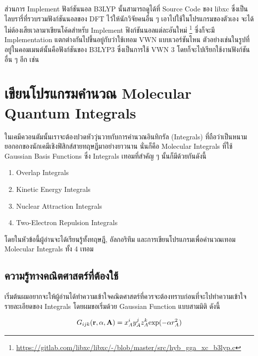 ส่วนการ Implement ฟังก์ชันนอล B3LYP นั้นสามารถดูได้ที่ Source Code ของ libxc ซึ่งเป็นไลบรารี่ที่รวบรวมฟังก์ชันนอลของ DFT
ไว้ให้นักวิจัยคนอื่น ๆ เอาไปใช้ในโปรแกรมของตัวเอง จะได้ไม่ต้องเสียเวลามาเขียนโค้ดสำหรับ Implement ฟังก์ชันนอลแต่ละอันใหม่%
\footnote{\url{https://gitlab.com/libxc/libxc/-/blob/master/src/hyb_gga_xc_b3lyp.c}} ซึ่งก็จะมี Implementation
แตกต่างกันไปขึ้นอยู่กับว่าใช้เทอม VWN แบบเวอร์ชันไหน ตัวอย่างเช่นในรูปที่อยู่ในคอมเมนต์นั้นคือฟังก์ชันของ B3LYP3 ซึ่งเป็นการใช้ VWN 3
โดยก็จะไปเรียกใช้งานฟังก์ชันอื่น ๆ อีก เช่น 

\section{เขียนโปรแกรมคำนวณ Molecular Quantum Integrals }

ในเคมีควอนตัมนั้นเราจะต้องปวดหัววุ่นวายกับการคำนวณอินทิกรัล (Integrals) ที่ถือว่าเป็นหนามยอกอกของนักเคมีเชิงฟิสิกส์สายทฤษฎีมาอย่างยาวนาน 
นั่นก็คือ Molecular Integrals ที่ใช้ Gaussian Basis Functions ซึ่ง Integrals เทอมที่สำคัญ ๆ นั้นก็มีด้วยกันดังนี้ 

\begin{enumerate}[topsep=0pt,noitemsep]
  \item Overlap Integrals
  
  \item Kinetic Energy Integrals
  
  \item Nuclear Attraction Integrals 
  
  \item Two-Electron Repulsion Integrals
\end{enumerate}

โดยในหัวข้อนี้ผู้อ่านจะได้เรียนรู้ทั้งทฤษฎี, อัลกอริทึม และการเขียนโปรแกรมเพื่อคำนวณเทอม Molecular Integrals ทั้ง 4 เทอม

\subsection{ความรู้ทางคณิตศาสตร์ที่ต้องใช้}

เริ่มต้นผมอยากจะให้ผู้อ่านได้ทำความเข้าใจคณิตศาสตร์ที่ควรจะต้องทราบก่อนที่จะไปทำความเข้าใจรายละเอียดของ Integrals โดยผมขอเริ่มด้วย
Gaussian Function แบบสามมิติ ดังนี้

\begin{equation}
  G_{ijk}(\mathbf{r}, \alpha, \mathbf{A}) 
  = 
  x_A^i y_A^j z_A^k \hbox{exp}(-\alpha r_A^2)
\end{equation}

